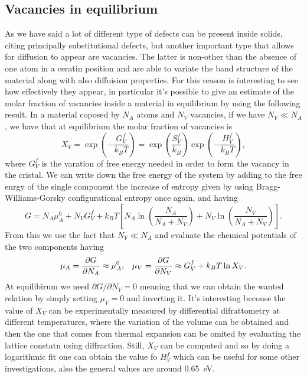 \subsection{Vacancies in equilibrium}

As we have said a lot of different type of defects can be present inside solids, citing principally substitutional defects, but another important type that allows for diffusion to appear are vacancies. The latter is non-other than the absence of one atom in a ceratin position and are able to variate the band structure of the material along with also diffuision properties. For this reason is interesting to see how effectively they appear, in particular it's possible to give an estimate of the molar fraction of vacancies inside a material in equilibrium by using the following result.
{
    In a material coposed by $N_A$ atoms and $N_V$ vacancies, if we have $N_V \ll N_A$, we have that at equilibrium the molar fraction of vacancies is
    \begin{equation}
        X_V = \exp\left( -\frac{G_V^f}{k_BT} \right) = \exp\left( \frac{S_V^f}{k_B} \right)\exp\left( -\frac{H_V^f}{k_BT} \right),
    \end{equation} 
    where $G_V^f$ is the varation of free energy needed in order to form the vacancy in the cristal.
}
{
    We can write down the free energy of the system by adding to the free enrgy of the single component the increase of entropy given by using Bragg-Williams-Gorsky configurational entropy once again, and having
    \begin{equation}
        G = N_A\mu_A^0 + N_V G_V^f + k_BT\left[ N_A\ln\left( \frac{N_A}{N_A + N_V} \right) + N_V\ln\left( \frac{N_V}{N_A + N_V} \right) \right].
    \end{equation}
    From this we use the fact that $N_V \ll N_A$ and evaluate the chemical potentials of the two components having
    \begin{align}
        &\mu_A = \pdv{G}{N_A} \approx \mu_A^0, &\mu_V = \pdv{G}{N_V} \approx G_V^f + k_BT\ln X_V.
    \end{align}
    At equilibirum we need $\partial G/\partial N_V = 0$ meaning that we can obtain the wanted relation by simply setting $\mu_V = 0$ and inverting it.
}
\noindent
It's interesting becouse the value of $X_V$ can be experimentally measured by differential difrattometry at different temperatures, where the variation of the volume can be obtained and then the one that comes from thermal expansion can be omited by evaluating the lattice constatn using diffraction. Still, $X_V$ can be computed and so by doing a logarithmic fit one can obtain the value fo $H_V^f$ which can be useful for some other investigations, also the general values are around \SI{0.65}{\electronvolt}.